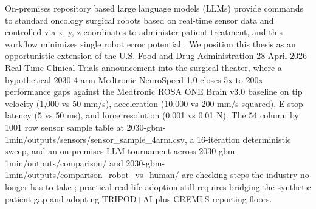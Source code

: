 
On-premises repository based large language models (LLMs) provide
commands to standard oncology surgical robots based on real-time
sensor data and controlled via x, y, z coordinates to administer
patient treatment, and this workflow minimizes single robot error
potential \cite{claude-opus-47, claude-code}. We position this thesis
as an opportunistic extension of the U.S. Food and Drug Administration
28 April 2026 Real-Time Clinical Trials announcement
\cite{fda2026realtime} into the surgical theater, where a hypothetical
2030 4-arm Medtronic NeuroSpeed 1.0 closes 5x to 200x performance gaps
against the Medtronic ROSA ONE Brain v3.0 baseline
\cite{rosa-one-brain, Lefranc2014ROSAStereotaxy} on tip velocity
(1,000 vs 50 mm/s), acceleration (10,000 vs 200 mm/s squared), E-stop
latency (5 vs 50 ms), and force resolution (0.001 vs 0.01 N). The
54 column by 1001 row sensor sample table at
2030-gbm-1min/outputs/sensors/sensor_sample_4arm.csv, a 16-iteration
deterministic sweep, and an on-premises LLM tournament across
2030-gbm-1min/outputs/comparison/ and
2030-gbm-1min/outputs/comparison_robot_vs_human/ are checking steps
the industry no longer has to take \cite{repo-robotic-surgeries,
kawchak_2026_20113157}; practical real-life adoption still requires
bridging the synthetic patient gap and adopting TRIPOD+AI plus CREMLS
reporting floors.
